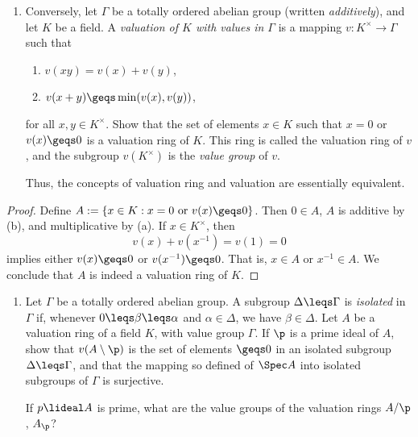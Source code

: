\documentclass[12pt]{amsart}
\begin{document}
\begin{enumerate}
  \item[5.31] {
      Conversely, let $\Gamma$ be a totally ordered abelian group (written \emph{additively}), and let $K$ be a field.
      A \emph{valuation of $K$ with values in $\Gamma$} is a mapping $v:K^\times \to \Gamma$ such that
      \begin{enumerate}
        \item $v(xy)= v(x)+v(y)$,
        \item $v(x+y)\geqs \min(v(x),v(y))$,
      \end{enumerate}
      for all $x,y\in K^\times$.
      Show that the set of elements $x\in K$ such that $x=0$ or $v(x)\geqs 0$ is a valuation ring of $K$.
      This ring is called the valuation ring of $v$, and the subgroup $v(K^\times)$ is the \emph{value group} of $v$.

      Thus, the concepts of valuation ring and valuation are essentially equivalent.
    }
\end{enumerate}

\begin{proof}
  Define $A:=\{x\in K:x=0\text{ or }v(x)\geqs 0\}$.
  Then $0\in A$, $A$ is additive by (b), and multiplicative by (a).
  If $x\in K^\times$, then 
  \[
    v(x)+v(x^{-1}) = v(1)=0
  \]
  implies either $v(x)\geqs 0$ or $v(x^{-1})\geqs 0$.
  That is, $x\in A$ or $x^{-1}\in A$.
  We conclude that $A$ is indeed a valuation ring of $K$.
\end{proof}

\begin{enumerate}
  \item[5.32] {
      Let $\Gamma$ be a totally ordered abelian group.
      A subgroup $\Delta\leqs\Gamma$ is \emph{isolated} in $\Gamma$ if, whenever $0\leqs \beta\leqs \alpha$ and $\alpha\in \Delta$, we have $\beta\in \Delta$.
      Let $A$ be a valuation ring of a field $K$, with value group $\Gamma$.
      If $\p$ is a prime ideal of $A$, show that $v(A\setminus \p)$ is the set of elements $\geqs 0$ in an isolated subgroup $\Delta\leqs \Gamma$, and that the mapping so defined of $\Spec A$ into isolated subgroups of $\Gamma$ is surjective.

      If $p\lideal A$ is prime, what are the value groups of the valuation rings $A/\p$, $A_\p$?
    }
\end{enumerate}
\end{document}
